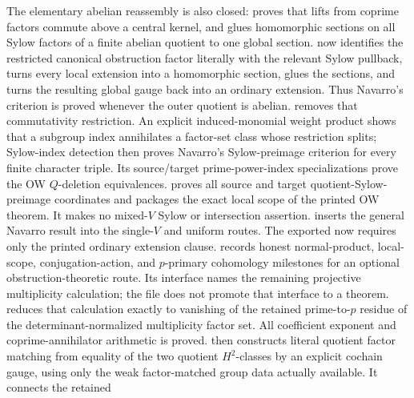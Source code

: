 \documentclass[11pt]{article}
\begin{document}
The elementary abelian reassembly is also closed:
 proves that lifts
from coprime factors commute above a central kernel, and
 glues homomorphic
sections on all Sylow factors of a finite abelian quotient to one global
section.
 now identifies the
restricted canonical obstruction factor literally with the relevant Sylow
pullback, turns every local extension into a homomorphic section, glues the
sections, and turns the resulting global gauge back into an ordinary
extension.  Thus Navarro's criterion is proved whenever the outer quotient
is abelian.
 removes that
commutativity restriction.  An explicit induced-monomial weight product
shows that a subgroup index annihilates a factor-set class whose
restriction splits; Sylow-index detection then proves Navarro's
Sylow-preimage criterion for every finite character triple.  Its
source/target prime-power-index specializations prove the OW
\(Q\)-deletion equivalences.
 proves all source and
target quotient-Sylow-preimage coordinates and packages the exact local
scope of the printed OW theorem.  It makes no mixed-\(V\) Sylow or
intersection assertion.
 inserts the
general Navarro result into the single-\(V\) and uniform routes.  The
exported  now
requires only the printed ordinary extension clause.
 records honest
normal-product, local-scope, conjugation-action, and \(p\)-primary
cohomology milestones for an optional obstruction-theoretic route.  Its
interface names the remaining projective multiplicity calculation; the
file does not promote that interface to a theorem.
 reduces
that calculation exactly to vanishing of the retained prime-to-\(p\)
residue of the determinant-normalized multiplicity factor set.  All
coefficient exponent and coprime-annihilator arithmetic is proved.
 then
constructs literal quotient factor matching from equality of the two
quotient \(H^2\)-classes by an explicit cochain gauge, using only the weak
factor-matched group data actually available.  It connects the retained
\end{document}
